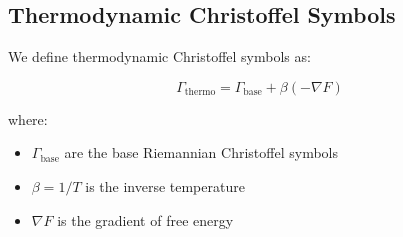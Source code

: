 \documentclass[12pt,a4paper]{article}
\begin{document}
\subsection{Thermodynamic Christoffel Symbols}

We define thermodynamic Christoffel symbols as:

\begin{equation}
\Gamma_{\text{thermo}} = \Gamma_{\text{base}} + \beta (-\nabla F)
\end{equation}

where:
\begin{itemize}[leftmargin=1.5cm]
\item $\Gamma_{\text{base}}$ are the base Riemannian Christoffel symbols
\item $\beta = 1/T$ is the inverse temperature
\item $\nabla F$ is the gradient of free energy
\end{itemize}
\end{document}
